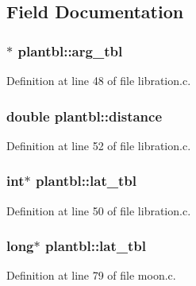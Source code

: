 \subsection{Field Documentation}
\hypertarget{structplantbl_a9ceee9dfe0bb4ed99bc3b7b4b4c12af0}{
\subsubsection[{arg\-\_\-tbl}]{ $\ast$ plantbl\-::arg\-\_\-tbl}}\label{structplantbl_a9ceee9dfe0bb4ed99bc3b7b4b4c12af0}


Definition at line 48 of file libration.\-c.

\hypertarget{structplantbl_ab9acb040d8ff71d13c43e41b774af6e1}{
\subsubsection[{distance}]{\setlength{\rightskip}{0pt plus 5cm}double plantbl\-::distance}}\label{structplantbl_ab9acb040d8ff71d13c43e41b774af6e1}


Definition at line 52 of file libration.\-c.

\hypertarget{structplantbl_ad241ee68e54f70ef891439e93bc82096}{
\subsubsection[{lat\-\_\-tbl}]{\setlength{\rightskip}{0pt plus 5cm}int$\ast$ plantbl\-::lat\-\_\-tbl}}\label{structplantbl_ad241ee68e54f70ef891439e93bc82096}


Definition at line 50 of file libration.\-c.

\hypertarget{structplantbl_a5a3e52dc23c73a6016fe2ccdd30f4d4f}{
\subsubsection[{lat\-\_\-tbl}]{\setlength{\rightskip}{0pt plus 5cm}long$\ast$ plantbl\-::lat\-\_\-tbl}}\label{structplantbl_a5a3e52dc23c73a6016fe2ccdd30f4d4f}


Definition at line 79 of file moon.\-c.

